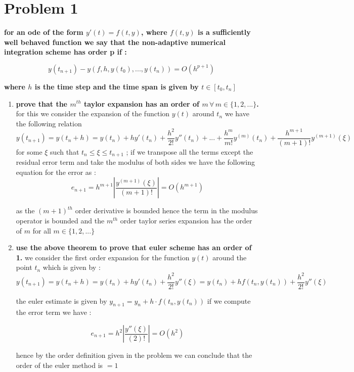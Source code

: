 \documentclass[12pt,letterpaper]{article}
\begin{document}
\section*{Problem 1}

\textbf{for an ode of the form $y'(t) = f(t, y)$, where $f(t,y)$ is a sufficiently well behaved function we say that the non-adaptive numerical integration scheme has order p if :}

\[ y(t_{n+1}) - y(f, h, y(t_0), ..., y(t_{n})) = O(h^{p+1})\]

\textbf{where $h$ is the time step and the time span is given by $t \in [t_0, t_n]$}
\begin{enumerate}
  \item
   \textbf{prove that the $m^{th}$ taylor expansion has an order of $m \, \forall \, m \in \{1, 2,...\}$.} 
   \newline
   \newline
   for this we consider the expansion of the function $y(t)$ around $t_n$ we have the following relation 
   \[y(t_{n+1})= y(t_n+h) = y(t_n) + h y'(t_n) + \frac{h^2}{2!} y''(t_n)+...+\frac{h^m}{m!}y^{(m)}(t_n) + \frac{h^{m+1}}{(m+1)!}y^{(m+1)}(\xi)\]
   for some $\xi$ such that $t_n \leq \xi \leq t_{n+1}$ ; if we transpose all the terms except the residual error term and take the modulus of both sides we have the following equation for the error as : 
   \[ e_{n+1} = h^{m+1}\left|\frac{y^{(m+1)}(\xi)}{(m+1)!}\right| = O(h^{m+1})\]
   
    as the $(m+1)^{th}$ order derivative is bounded hence the term in the modulus operator is bounded and the $m^{th}$ order taylor series expansion has the order of $m$ for all $m \in \{1, 2, ... \}$ 
  \item
    \textbf{use the above theorem to prove that euler scheme has an order of 1.}
    \newline
    \newline
    we consider the first order expansion for the function $y(t)$ around the point $t_n$ which is given by :
    \[y(t_{n+1})= y(t_n+h) = y(t_n) + h y'(t_n) + \frac{h^2}{2!} y''(\xi) = y(t_n) + h f(t_n, y(t_n)) + \frac{h^2}{2!} y''(\xi) \]
    
    the euler estimate is given by $y_{n+1} = y_n + h\cdot f(t_n, y(t_n))$ if we compute the error term we have :
    
    \[ e_{n+1} = h^{2}\left|\frac{y''(\xi)}{(2)!}\right| = O(h^{2})\]
    
    hence by the order definition given in the problem we can conclude that the order of the euler method is $= 1$
    



\end{enumerate}
\end{document}
